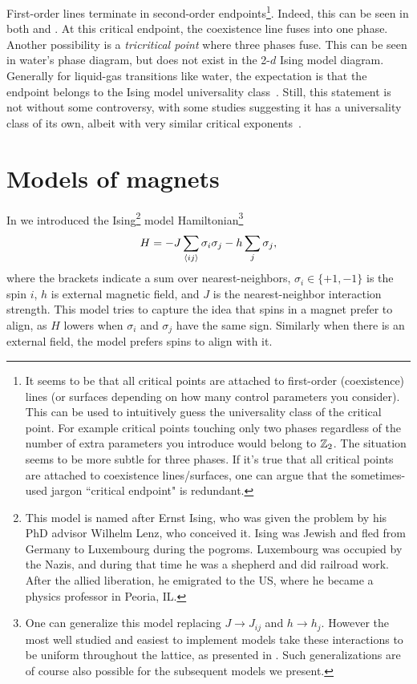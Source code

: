 First-order lines terminate in second-order 
endpoints\footnote{It seems to be that
all critical points are attached to first-order (coexistence) lines
(or surfaces depending on how many control parameters you consider).
This can be used to intuitively guess the universality class of
the critical point. For example critical points touching only two phases
regardless of the number of extra parameters you introduce would
belong to $\mathbb{Z}_2$. The situation seems to be more subtle for three phases.
If it's true that all critical points are attached to coexistence
lines/surfaces, one can argue that the sometimes-used jargon
``critical endpoint" is redundant.}.
Indeed, this
can be seen in both  and .
At this critical endpoint, the coexistence line fuses into one phase.
Another possibility is a {\it tricritical point}
where three phases fuse. This can be seen in water's phase diagram, but
does not exist in the 2-$d$ Ising model diagram.
Generally for liquid-gas transitions like
water, the expectation is that the endpoint belongs to the Ising
model universality
class~\cite{hubbard_wilson_1972,bruce_scaling_1992,wilding_critical-point_1995,yarmolinsky_revisiting_2017}.
Still, this statement is not without some controversy, with some studies suggesting
it has a universality class of its own, albeit with very similar
critical exponents~\cite{valls_liquid-gas_1978}.

\section{Models of magnets}

In  we introduced the Ising\footnote{This
model is named after Ernst Ising, who was given the problem by his
PhD advisor Wilhelm Lenz, who conceived it. Ising was Jewish and
fled from Germany to Luxembourg during the pogroms. Luxembourg was
occupied by the Nazis, and during that time he was a shepherd and did
railroad work. After the allied liberation, he emigrated to the US,
where he became a physics professor in Peoria, IL.} model 
Hamiltonian\footnote{One can generalize this model replacing
$J\to J_{ij}$ and $h\to h_j$. However the most well studied and easiest
to implement models take these interactions to be uniform throughout
the lattice, as presented in . Such generalizations
are of course also possible for the subsequent models we present.}
\begin{equation}\label{eq:ising}
H=-J\sum_{\ev{i j}} \sigma_i \sigma_j-h \sum_j
\sigma_j,
\end{equation}
where the brackets indicate a sum over nearest-neighbors,
$\sigma_i\in\{+1,-1\}$ is the spin $i$, $h$ is 
external magnetic field, and $J$ is the
nearest-neighbor interaction strength. 
This model tries to capture the
idea that spins in a magnet prefer to align, as $H$ lowers when
$\sigma_i$ and $\sigma_j$ have the same sign. Similarly when there
is an external field, the model prefers spins to align with it.

